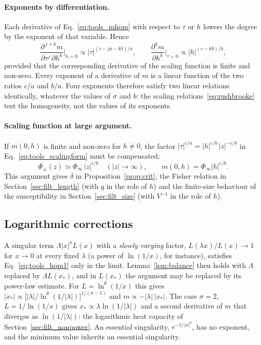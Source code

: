 \documentclass[10pt,a4paper]{article}
\theoremstyle{plain}
\begin{document}
\paragraph{Exponents by differentiation.} Each derivative of
Eq.~\eqref{eq:tools_mhom} with respect to $\tau$ or $h$ lowers the degree by
the exponent of that variable. Hence
\begin{equation}\label{eq:tools_expo}
  \frac{\partial^{\,j+k}m}{\partial\tau^{j}\,\partial h^{k}}\bigg|_{h=0}
  \propto|\tau|^{(c-ja-kb)/a} ,
  \qquad
  \frac{\partial^{k}m}{\partial h^{k}}\bigg|_{\tau=0}
  \propto|h|^{(c-kb)/b} ,
\end{equation}
provided that the corresponding derivative of the scaling function is finite
and non-zero. Every exponent of a derivative of $m$ is a linear function of
the two ratios $c/a$ and $b/a$. Four exponents therefore satisfy two linear
relations identically, whatever the values of $\sigma$ and $b$: the scaling
relations~\eqref{eq:rushbrooke} test the homogeneity, not the values of its
exponents.

\paragraph{Scaling function at large argument.} If $m(0,h)$ is finite and
non-zero for $h\neq0$, the factor $|\tau|^{c/a}=|h|^{c/b}\,|z|^{-c/b}$ in
Eq.~\eqref{eq:tools_scalingform} must be compensated:
\begin{equation}\label{eq:tools_match}
  \Phi_\pm(z)\simeq\Phi_\infty\,|z|^{c/b}\quad(|z|\to\infty) ,
  \qquad m(0,h)=\Phi_\infty|h|^{c/b} .
\end{equation}
This argument gives $\delta$ in Proposition~\ref{prop:crit}, the Fisher
relation in Section~\ref{sec:filt_length} (with $q$ in the role of $h$) and
the finite-size behaviour of the susceptibility in
Section~\ref{sec:filt_size} (with $V^{-1}$ in the role of $h$).

\subsection{Logarithmic corrections}
\label{sec:tools_logs}

A singular term $\Lambda|x|^{\sigma}L(x)$ with a \emph{slowly varying}
factor, $L(\lambda x)/L(x)\to1$ for $x\to0$ at every fixed $\lambda$ (a power
of $\ln(1/x)$, for instance), satisfies Eq.~\eqref{eq:tools_hom1} only in the
limit. Lemma~\ref{lem:balance} then holds with $\Lambda$ replaced by
$\Lambda L(x_*)$, and in $L(x_*)$ the argument may be replaced by its
power-law estimate. For $L=\ln^{\theta}(1/x)$ this gives
$|x_*|\propto\big[|\lambda|/\ln^{\theta}(1/|\lambda|)\big]^{1/(\sigma-1)}$ and
$m\propto-|\lambda|\,|x_*|$. The case $\sigma=2$, $L=1/\ln(1/x)$ gives
$x_*\propto\lambda\ln(1/|\lambda|)$ and a second derivative of $m$ that
diverges as $\ln(1/|\lambda|)$: the logarithmic heat capacity of
Section~\ref{sec:filt_nonpower}. An essential singularity,
$e^{-1/|x|^{\theta}}$, has no exponent, and the minimum value inherits an
essential singularity.
\end{document}
